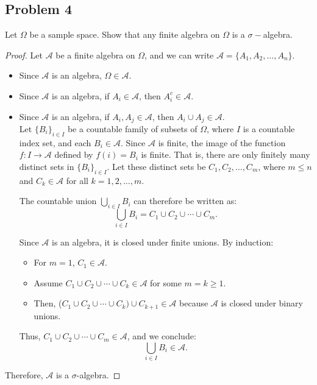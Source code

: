 \documentclass[letterpaper, 11pt]{article}
\newcommand{\1}{\mathds{1}}	%
\theoremstyle{definition}
\begin{document}
\subsection*{Problem 4}
Let $\Omega$ be a sample space. Show that any finite algebra on $\Omega$ is a $\sigma-$algebra.
\begin{proof}
Let $\mathcal{A}$ be a finite algebra on $\Omega$, and we can write $\mathcal{A} = \{A_1, A_2, \ldots, A_n\}$. 
\begin{itemize}
\item Since $\mathcal{A}$ is an algebra, $\Omega \in \mathcal{A}$.
\item Since $\mathcal{A}$ is an algebra, if $A_i \in \mathcal{A}$, then $A_i^c \in \mathcal{A}$.
\item Since $\mathcal{A}$ is an algebra, if $A_i, A_j \in \mathcal{A}$, then $A_i \cup A_j \in \mathcal{A}$.
\\Let \(\{B_i\}_{i \in I}\) be a countable family of subsets of \(\Omega\), where \(I\) is a countable index set, and each \(B_i \in \mathcal{A}\). Since \(\mathcal{A}\) is finite, the image of the function \(f: I \to \mathcal{A}\) defined by \(f(i) = B_i\) is finite. That is, there are only finitely many distinct sets in \(\{B_i\}_{i \in I}\). Let these distinct sets be \(C_1, C_2, \dots, C_m\), where \(m \leq n\) and \(C_k \in \mathcal{A}\) for all \(k = 1, 2, \dots, m\).

The countable union \(\bigcup_{i \in I} B_i\) can therefore be written as:
\[
\bigcup_{i \in I} B_i = C_1 \cup C_2 \cup \cdots \cup C_m.
\]

Since \(\mathcal{A}\) is an algebra, it is closed under finite unions. By induction:
\begin{itemize}
    \item For \(m = 1\), \(C_1 \in \mathcal{A}\).
    \item Assume \(C_1 \cup C_2 \cup \cdots \cup C_k \in \mathcal{A}\) for some \(m=k \geq 1\).
    \item Then, (\(C_1 \cup C_2 \cup \cdots \cup C_k) \cup C_{k+1} \in \mathcal{A}\) because \(\mathcal{A}\) is closed under binary unions.
\end{itemize}

Thus, \(C_1 \cup C_2 \cup \cdots \cup C_m \in \mathcal{A}\), and we conclude:
\[
\bigcup_{i \in I} B_i \in \mathcal{A}.
\]

\end{itemize}
Therefore, \(\mathcal{A}\) is a \(\sigma\)-algebra.
\end{proof}
\end{document}
